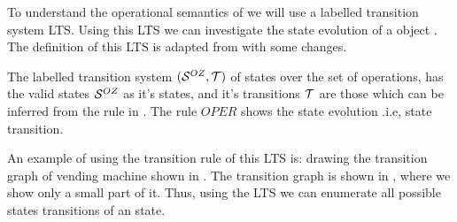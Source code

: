 To understand the operational semantics of \oz{} we will use  a labelled transition system LTS. Using this LTS we can investigate the state evolution of a \oz{} object . The definition of this LTS is adapted from  with some changes.

\begin{definition}[LTS of \oz{}]
\label{def_oz_trans_system}
The labelled transition system $(\stats,\traces)$ of \oz{} states over the set of operations, has the valid states $\mathcal S^{OZ}$ as it's states, and it's transitions $\traces$ are those which can be inferred from the rule in .
The rule $OPER$ shows the state evolution .i.e, state transition.

\end{definition}
An example of using the transition rule of this LTS is: drawing the transition graph of vending machine shown in  . The transition graph is shown in , where we show only a small part of it. Thus, using the LTS we can enumerate all possible states transitions of an \oz{} state.


